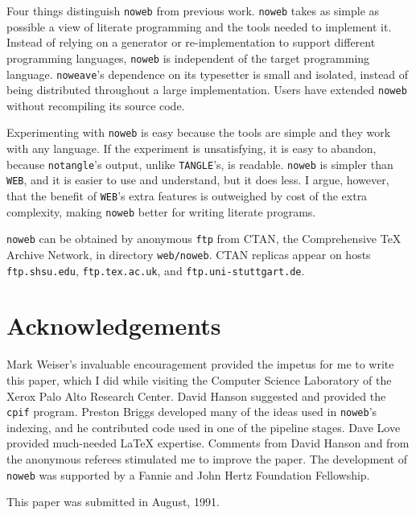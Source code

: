 Four things distinguish {\tt noweb} from previous work.
{\tt noweb} takes as simple as possible a view of literate programming
and the tools needed to implement it.
Instead of relying on a generator or re-implementation to support
different programming languages, {\tt noweb} is independent of the
target programming language.
{\tt noweave}'s dependence on its typesetter is small and isolated,
instead of being distributed throughout a large implementation.
Users have extended {\tt noweb} without recompiling its source code.

Experimenting with {\tt noweb} is easy because the tools are simple
and they work with any language.
If the experiment is unsatisfying, it is easy to abandon, because
\verb+notangle+'s output, unlike {\tt TANGLE}'s, is readable.
\verb+noweb+ is simpler than {\tt WEB}, and it is easier to use and
understand, but it does less.
I argue, however, that the benefit of {\tt WEB}'s extra features is
outweighed by cost of the extra complexity,
making \verb+noweb+  better for writing literate programs.

\verb+noweb+ can be obtained by
anonymous {\tt ftp} from CTAN,
the Comprehensive {\TeX}
Archive Network, in directory {\tt web/noweb}.  CTAN replicas appear
on
hosts {\tt ftp.shsu.edu}, {\tt ftp.tex.ac.uk}, and {\tt ftp.uni-stuttgart.de}.

\section{Acknowledgements}
Mark Weiser's invaluable encouragement provided the impetus for me to
write this paper, which I did while visiting the Computer
Science Laboratory of the Xerox Palo Alto Research Center.
David Hanson suggested and provided the \verb+cpif+ program.
Preston Briggs developed many of the ideas used in \verb+noweb+'s
indexing, and he contributed code used in one of the pipeline stages.
Dave Love provided much-needed {\LaTeX} expertise.
Comments from David Hanson and from the anonymous referees stimulated
me to improve the paper.
The development of {\tt noweb} was supported by a Fannie and John Hertz
Foundation Fellowship.

This paper was submitted in August, 1991.




\clearpage
{}	%




